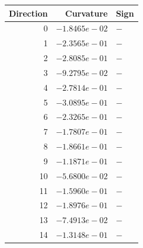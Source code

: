 \begin{tabular}{rrl}
\toprule
Direction & Curvature & Sign \\
\midrule
0 & $-1.8465e-02$ & $-$ \\
1 & $-2.3565e-01$ & $-$ \\
2 & $-2.8085e-01$ & $-$ \\
3 & $-9.2795e-02$ & $-$ \\
4 & $-2.7814e-01$ & $-$ \\
5 & $-3.0895e-01$ & $-$ \\
6 & $-2.3265e-01$ & $-$ \\
7 & $-1.7807e-01$ & $-$ \\
8 & $-1.8661e-01$ & $-$ \\
9 & $-1.1871e-01$ & $-$ \\
10 & $-5.6800e-02$ & $-$ \\
11 & $-1.5960e-01$ & $-$ \\
12 & $-1.8976e-01$ & $-$ \\
13 & $-7.4913e-02$ & $-$ \\
14 & $-1.3148e-01$ & $-$ \\
\bottomrule
\end{tabular}
